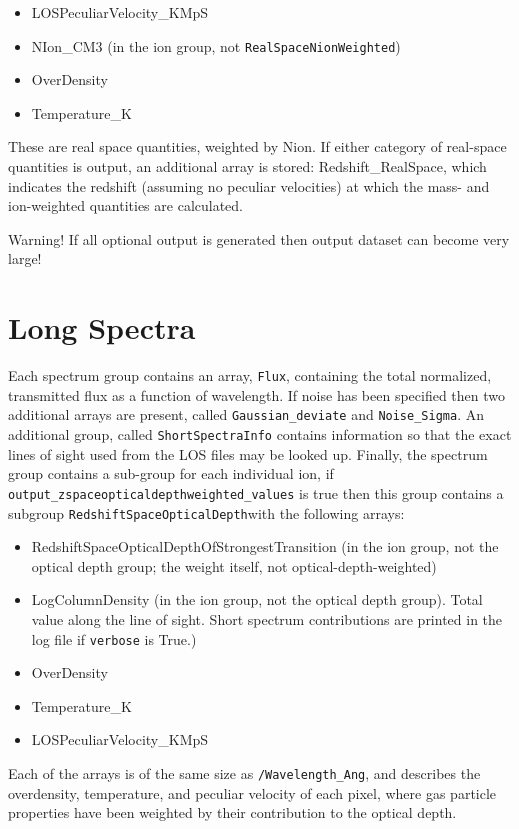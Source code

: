 \documentclass{report}
\newcommand{\param}[1]{{\tt #1}}
\begin{document}
\begin{itemize}
\item LOSPeculiarVelocity\_KMpS
\item NIon\_CM3 (in the ion group, not {\tt RealSpaceNionWeighted})
\item OverDensity
\item Temperature\_K
\end{itemize}

These are real space quantities, weighted by Nion.  If either category of real-space quantities is output, an additional array is stored: Redshift\_RealSpace, which indicates the redshift (assuming no peculiar velocities) at which the mass- and ion-weighted quantities are calculated.

Warning!  If all optional output is generated then output dataset can become very large!

\section{Long Spectra}

Each spectrum group contains an array, {\tt Flux}, containing the total normalized, transmitted flux as a function of wavelength.  If noise has been specified then two additional arrays are present, called {\tt Gaussian\_deviate} and {\tt Noise\_Sigma}.  An additional group, called {\tt ShortSpectraInfo} contains information so that the exact lines of sight used from the LOS files may be looked up.  Finally, the spectrum group contains a sub-group for each individual ion, if {\tt output\_zspaceopticaldepthweighted\_values} is true then this group contains a subgroup {\tt RedshiftSpaceOpticalDepth}with the following arrays:

\begin{itemize}
\item RedshiftSpaceOpticalDepthOfStrongestTransition (in the ion group, not the optical depth group; the weight itself, not optical-depth-weighted)
\item LogColumnDensity (in the ion group, not the optical depth group). Total value along the line of sight. Short spectrum contributions are printed in the log file if \param{verbose} is True.)
\item OverDensity
\item Temperature\_K
\item LOSPeculiarVelocity\_KMpS
\end{itemize}

Each of the arrays is of the same size as {\tt /Wavelength\_Ang}, and describes the overdensity, temperature, and peculiar velocity of each pixel, where gas particle properties have been weighted by their contribution to the optical depth.
\end{document}
